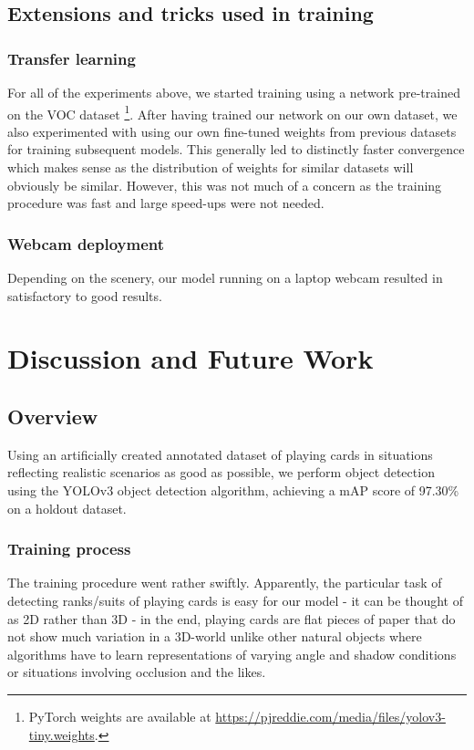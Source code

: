 \documentclass[a4paper]{article}
\begin{document}
\subsection*{Extensions and tricks used in training}
\subsubsection*{Transfer learning}
For all of the experiments above, we started training using a network pre-trained on the VOC dataset \cite{Everingham15} \footnote{PyTorch weights are available at \url{https://pjreddie.com/media/files/yolov3-tiny.weights}.}. After having trained our network on our own dataset, we also experimented with using our own fine-tuned weights from previous datasets for training subsequent models. This generally led to distinctly faster convergence which makes sense as the distribution of weights for similar datasets will obviously be similar. However, this was not much of a concern as the training procedure was fast and large speed-ups were not needed.
\subsubsection*{Webcam deployment}
Depending on the scenery, our model running on a laptop webcam resulted in satisfactory to good results.
\section{Discussion and Future Work}
\subsection{Overview}
Using an artificially created annotated dataset of playing cards in situations reflecting realistic scenarios as good as possible, we perform object detection using the YOLOv3 object detection algorithm, achieving a mAP score of 97.30\% on a holdout dataset. \\ 
\subsubsection*{Training process}
The training procedure went rather swiftly. Apparently,  the particular task of detecting ranks/suits of playing cards is easy for our model - it can be thought of as 2D rather than 3D - in the end, playing cards are flat pieces of paper that do not show much variation in a 3D-world unlike other natural objects where algorithms have to learn representations of varying angle and shadow conditions or situations involving occlusion and the likes. \\
\end{document}
